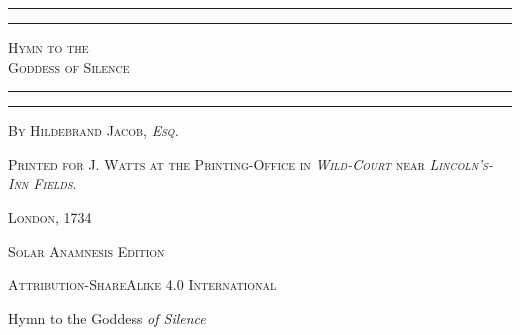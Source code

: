 \documentclass[a4paper, 11pt, oneside]{article}
\begin{document}
\Fontauri
\bfseries
\begin{titlepage} %
	\centering %

	
	\rule{\textwidth}{1.6pt}\vspace*{-\baselineskip}\vspace*{2pt} %
	\rule{\textwidth}{0.4pt} %
	
	{\scshape\Huge Hymn to the \\ Goddess of Silence}
	
	\rule{\textwidth}{0.4pt}\vspace*{-\baselineskip}\vspace{3.2pt} %
	\rule{\textwidth}{1.6pt} %

	
	\vspace{1\baselineskip}
	
	{\scshape \large By \LARGE Hildebrand Jacob, \emph{Esq.}} %
	





	
	


\vspace*{\fill}

	\vspace{1\baselineskip}

	{\normalsize\scshape Printed for J. Watts at the Printing-Office in \emph{Wild-Court} near \emph{Lincoln's-Inn Fields}.}
	
	{\scshape{London, 1734}}
	
	\vspace{0.5\baselineskip} %



\scshape Solar Anamnesis Edition
	
	{\scshape\small Attribution-ShareAlike 4.0 International} %
\end{titlepage}
\setlength{\parskip}{1mm plus1mm minus1mm}
\setcounter{tocdepth}{3}
\setcounter{secnumdepth}{3}
\clearpage
\pagestyle{fancy}
\fancyhf{}
\renewcommand{\headrulewidth}{0pt}
\cfoot{\large\Fontauri{\thepage}}
\begin{center}\Huge
Hymn to the Goddess \emph{of Silence}
\end{center}
\end{document}
